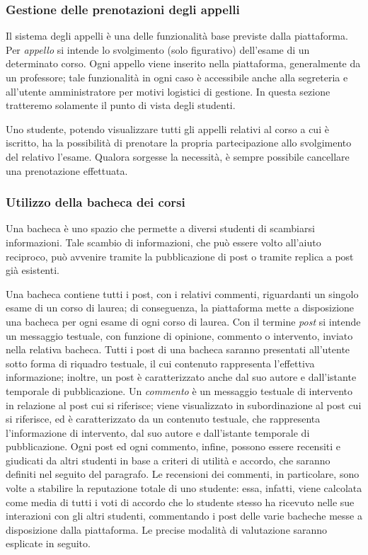 \documentclass [a4paper,11pt]{book}
\begin{document}
\medskip

\subsubsection{Gestione delle prenotazioni degli appelli}

Il sistema degli appelli è una delle funzionalità base previste dalla piattaforma. Per \emph{appello} si intende lo svolgimento (solo figurativo) dell'esame di un determinato corso. Ogni appello viene inserito nella piattaforma, generalmente da un professore; tale funzionalità in ogni caso è accessibile anche alla segreteria e all'utente amministratore per motivi logistici di gestione. In questa sezione tratteremo solamente il punto di vista degli studenti.

Uno studente, potendo visualizzare tutti gli appelli relativi al corso a cui è iscritto, ha la possibilità di prenotare la propria partecipazione allo svolgimento del relativo l'esame. Qualora sorgesse la necessità, è sempre possibile cancellare una prenotazione effettuata.

\medskip

\subsubsection{Utilizzo della bacheca dei corsi}

\label{sec:bacheca}

Una bacheca è uno spazio che permette a diversi studenti di scambiarsi informazioni. Tale scambio di informazioni, che può essere volto all'aiuto reciproco, può avvenire tramite la pubblicazione di post o tramite replica a post già esistenti.

Una bacheca contiene tutti i post, con i relativi commenti, riguardanti un singolo esame di un corso di laurea; di conseguenza, la piattaforma mette a disposizione una bacheca per ogni esame di ogni corso di laurea. Con il termine \emph{post} si intende un messaggio testuale, con funzione di opinione, commento o intervento, inviato nella relativa bacheca. Tutti i post di una bacheca saranno presentati all'utente sotto forma di riquadro testuale, il cui contenuto rappresenta l'effettiva informazione; inoltre, un post è caratterizzato anche dal suo autore e dall'istante temporale di pubblicazione. Un \emph{commento} è un messaggio testuale di intervento in relazione al post cui si riferisce; viene visualizzato in subordinazione al post cui si riferisce, ed è caratterizzato da un contenuto testuale, che rappresenta l'informazione di intervento, dal suo autore e dall'istante temporale di pubblicazione. Ogni post ed ogni commento, infine, possono essere recensiti e giudicati da altri studenti in base a criteri di utilità e accordo, che saranno definiti nel seguito del paragrafo. Le recensioni dei commenti, in particolare, sono volte a stabilire la reputazione totale di uno studente: essa, infatti, viene calcolata come media di tutti i voti di accordo che lo studente stesso ha ricevuto nelle sue interazioni con gli altri studenti, commentando i post delle varie bacheche messe a disposizione dalla piattaforma. Le precise modalità di valutazione saranno esplicate in seguito.
\end{document}
